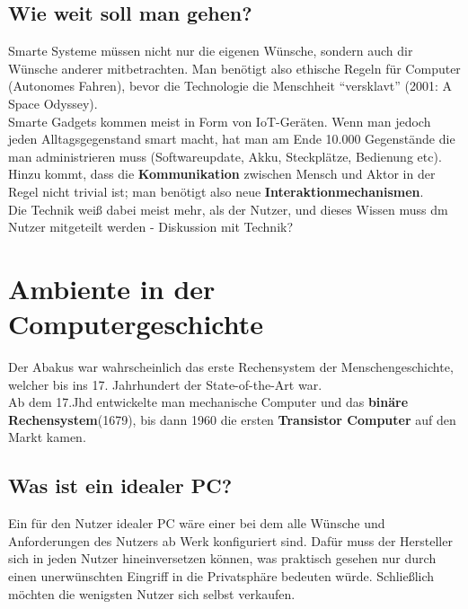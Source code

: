 \documentclass[a4paper]{article}
\begin{document}
\subsection{Wie weit soll man gehen?}
Smarte Systeme müssen nicht nur die eigenen Wünsche, sondern auch dir Wünsche anderer mitbetrachten. Man benötigt also ethische Regeln für Computer (Autonomes Fahren), bevor die Technologie die Menschheit ``versklavt'' (2001: A Space Odyssey).\\

Smarte Gadgets kommen meist in Form von IoT-Geräten. Wenn man jedoch jeden Alltagsgegenstand smart macht, hat man am Ende 10.000 Gegenstände die man administrieren muss (Softwareupdate, Akku, Steckplätze, Bedienung etc). Hinzu kommt, dass die \textbf{Kommunikation} zwischen Mensch und Aktor in der Regel nicht trivial ist; man benötigt also neue \textbf{Interaktionmechanismen}.\\

 Die Technik weiß dabei meist mehr, als der Nutzer, und dieses Wissen muss dm Nutzer mitgeteilt werden - Diskussion mit Technik?

\newpage
\section{Ambiente in der Computergeschichte}
Der Abakus war wahrscheinlich das erste Rechensystem der Menschengeschichte, welcher bis ins 17. Jahrhundert der State-of-the-Art war.\\
Ab dem 17.Jhd entwickelte man mechanische Computer und das \textbf{binäre Rechensystem}(1679), bis dann 1960 die ersten \textbf{Transistor Computer} auf den Markt kamen.
\subsection{Was ist ein idealer PC?}
Ein für den Nutzer idealer PC wäre einer bei dem alle Wünsche und Anforderungen des Nutzers ab Werk konfiguriert sind. Dafür muss der Hersteller sich in jeden Nutzer hineinversetzen können, was praktisch gesehen nur durch einen unerwünschten Eingriff in die Privatsphäre bedeuten würde. Schließlich möchten die wenigsten Nutzer sich selbst verkaufen.
\end{document}
